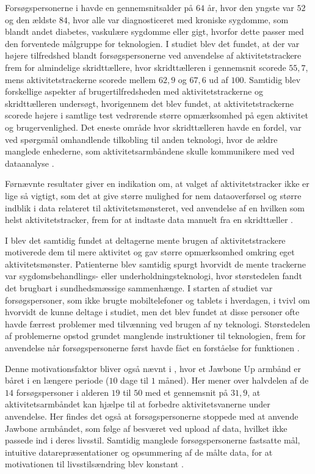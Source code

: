 Forsøgspersonerne i \cite{mercer2016} havde en gennemsnitsalder på $64$ år, hvor den yngste var $52$ og den ældste $84$, hvor alle var diagnosticeret med kroniske sygdomme, som blandt andet diabetes, vaskulære sygdomme eller gigt, hvorfor dette passer med den forventede målgruppe for teknologien. I studiet blev det fundet, at der var højere tilfredshed blandt forsøgspersonerne ved anvendelse af aktivitetstrackere frem for almindelige skridttællere, hvor skridttælleren i gennemsnit scorede $55,7$, mens aktivitetstrackerne scorede mellem $62,9$ og $67,6$ ud af $100$. Samtidig blev forskellige aspekter af brugertilfredsheden med aktivitetstrackerne og skridttælleren undersøgt, hvorigennem det blev fundet, at aktivitetstrackerne scorede højere i samtlige test vedrørende større opmærksomhed på egen aktivitet og brugervenlighed. Det eneste område hvor skridttælleren havde en fordel, var ved spørgsmål omhandlende tilkobling til anden teknologi, hvor de ældre manglede enhederne, som aktivitetsarmbåndene skulle kommunikere med ved dataanalyse \citep{mercer2016}.

Førnævnte resultater giver en indikation om, at valget af aktivitetstracker ikke er lige så vigtigt, som det at give større mulighed for nem dataoverførsel og større indblik i data relateret til aktivitetsmønsteret, ved anvendelse af en hvilken som helst aktivitetstracker, frem for at indtaste data manuelt fra en skridttæller \citep{mercer2016}.

I \cite{mercer2016} blev det samtidig fundet at deltagerne mente brugen af aktivitetstrackere motiverede dem til mere aktivitet og gav større opmærksomhed omkring eget aktivitetsmønster. Patienterne blev samtidig spurgt hvorvidt de mente trackerne var sygdomsbehandlings- eller underholdningsteknologi, hvor størstedelen fandt det brugbart i sundhedsmæssige sammenhænge. I starten af studiet var forsøgspersoner, som ikke brugte mobiltelefoner og tablets i hverdagen, i tvivl om hvorvidt de kunne deltage i studiet, men det blev fundet at disse personer ofte havde færrest problemer med tilvænning ved brugen af ny teknologi. Størstedelen af problemerne opstod grundet manglende instruktioner til teknologien, frem for anvendelse når forsøgspersonerne først havde fået en forståelse for funktionen \citep{mercer2016}.

Denne motivationsfaktor bliver også nævnt i \cite{rapp2016}, hvor et Jawbone Up armbånd er båret i en længere periode ($10$ dage til $1$ måned). Her mener over halvdelen af de $14$ forsøgspersoner i alderen $19$ til $50$ med et gennemsnit på $31,9$, at aktivitetsarmbåndet kan hjælpe til at forbedre aktivitetsvanerne under anvendelse. Her findes det også at forsøgspersonerne stoppede med at anvende Jawbone armbåndet, som følge af besværet ved upload af data, hvilket ikke passede ind i deres livsstil. Samtidig manglede forsøgspersonerne fastsatte mål, intuitive datarepræsentationer og opsummering af de målte data, for at motivationen til livsstilsændring blev konstant \citep{rapp2016}.

